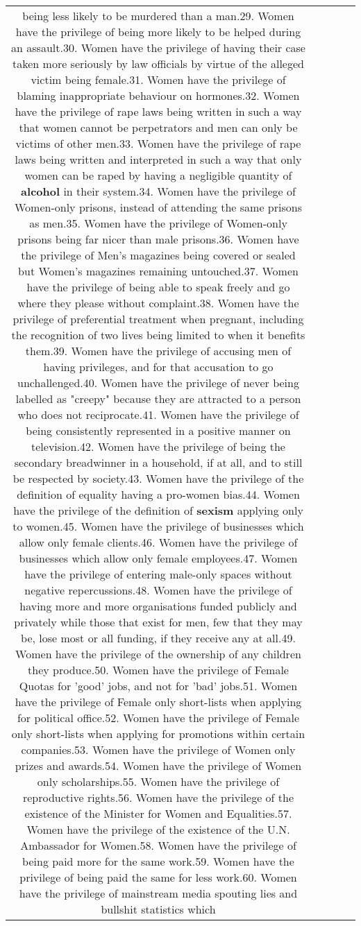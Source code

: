 \documentclass[11pt]{article}
\newlength\mylength
\begin{document}
\begin{center}
\begin{longtable}{|C{.65\mylength}|C{.30\mylength}|C{.12\mylength}|C{.12\mylength}|C{.12\mylength}|}
being less likely to be murdered than a man.29. Women have the privilege of being more likely to be helped during an assault.30. Women have the privilege of having their case taken more seriously by law officials by virtue of the alleged victim being female.31. Women have the privilege of blaming inappropriate behaviour on hormones.32. Women have the privilege of rape laws being written in such a way that women cannot be perpetrators and men can only be victims of other men.33. Women have the privilege of rape laws being written and interpreted in such a way that only women can be raped by having a negligible quantity of \textbf{alcohol} in their system.34. Women have the privilege of Women-only prisons, instead of attending the same prisons as men.35. Women have the privilege of  Women-only prisons being far nicer than male prisons.36. Women have the privilege of Men's magazines being covered or sealed but Women's magazines remaining untouched.37. Women have the privilege of being able to speak freely and go where they please without complaint.38. Women have the privilege of preferential treatment when pregnant, including the recognition of two lives being limited to when it benefits them.39. Women have the privilege of accusing men of having privileges, and for that accusation to go unchallenged.40. Women have the privilege of never being labelled as "creepy" because they are attracted to a person who does not reciprocate.41. Women have the privilege of being consistently represented in a positive manner on television.42. Women have the privilege of being the secondary breadwinner in a household, if at all, and to still be respected by society.43. Women have the privilege of the definition of equality having a pro-women bias.44. Women have the privilege of the definition of \textbf{sexism} applying only to women.45. Women have the privilege of businesses which allow only female clients.46. Women have the privilege of businesses which allow only female employees.47. Women have the privilege of entering male-only spaces without negative repercussions.48. Women have the privilege of having more and more organisations funded publicly and privately while those that exist for men, few that they may be, lose most or all funding, if they receive any at all.49. Women have the privilege of the ownership of any children they produce.50. Women have the privilege of Female Quotas for 'good' jobs, and not for 'bad' jobs.51. Women have the privilege of Female only short-lists when applying for political office.52. Women have the privilege of Female only short-lists when applying for promotions within certain companies.53. Women have the privilege of Women only prizes and awards.54. Women have the privilege of Women only scholarships.55. Women have the privilege of reproductive rights.56. Women have the privilege of the existence of the Minister for Women and Equalities.57. Women have the privilege of the existence of the U.N. Ambassador for Women.58. Women have the privilege of being paid more for the same work.59. Women have the privilege of being paid the same for less work.60. Women have the privilege of mainstream media spouting lies and bullshit statistics which 
\end{longtable}
\end{center}
\end{document}
